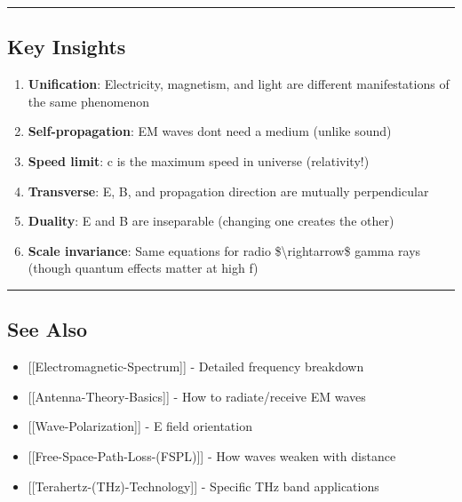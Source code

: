 \begin{center}\rule{0.5\linewidth}{0.5pt}\end{center}

\subsection{\texorpdfstring{ Key
Insights}{ Key Insights}}\label{key-insights}

\begin{enumerate}
\def\labelenumi{\arabic{enumi}.}
\tightlist
\item
  \textbf{Unification}: Electricity, magnetism, and light are different
  manifestations of the same phenomenon
\item
  \textbf{Self-propagation}: EM waves don\textquotesingle t need a
  medium (unlike sound)
\item
  \textbf{Speed limit}: c is the maximum speed in universe (relativity!)
\item
  \textbf{Transverse}: E, B, and propagation direction are mutually
  perpendicular
\item
  \textbf{Duality}: E and B are inseparable (changing one creates the
  other)
\item
  \textbf{Scale invariance}: Same equations for radio
  \$\textbackslash rightarrow\$ gamma rays (though quantum effects
  matter at high f)
\end{enumerate}

\begin{center}\rule{0.5\linewidth}{0.5pt}\end{center}

\subsection{\texorpdfstring{ See Also}{ See Also}}\label{see-also}

\begin{itemize}
\tightlist
\item
  {[}{[}Electromagnetic-Spectrum{]}{]} - Detailed frequency breakdown
\item
  {[}{[}Antenna-Theory-Basics{]}{]} - How to radiate/receive EM waves
\item
  {[}{[}Wave-Polarization{]}{]} - E field orientation
\item
  {[}{[}Free-Space-Path-Loss-(FSPL){]}{]} - How waves weaken with
  distance
\item
  {[}{[}Terahertz-(THz)-Technology{]}{]} - Specific THz band
  applications
\end{itemize}

